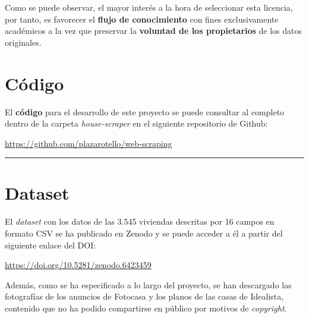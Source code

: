 \documentclass[12pt]{article}
\begin{document}
Como se puede observar, el mayor interés a la hora de seleccionar esta licencia, por tanto, es favorecer el \textbf{flujo de conocimiento} con fines exclusivamente académicos a la vez que preservar la \textbf{voluntad de los propietarios} de los datos originales. 

\newpage
\vspace{-1.5em}\section{Código}\vspace{-1em}

El \textbf{código} para el desarrollo de este proyecto se puede consultar al completo dentro de la carpeta \textit{house-scraper} en el siguiente repositorio de Github: 

\vspace{-1em}\begin{center}\url{https://github.com/plazarotello/web-scraping}\end{center}\vspace{-1em}

\begin{center}
	\vspace{-0.5cm}
	{\color{uocblue}\rule{0.75\linewidth}{1pt}}
	\vspace{-0.5cm}
\end{center}

\vspace{-1.5em}\section{Dataset}\vspace{-1em}

El \textit{dataset} con los datos de las 3.545 viviendas descritas por 16 campos en formato CSV se ha publicado en Zenodo y se puede acceder a él a partir del siguiente enlace del DOI: 

\vspace{-1em}\begin{center}\url{https://doi.org/10.5281/zenodo.6423459}\end{center}\vspace{-1em}

Además, como se ha especificado a lo largo del proyecto, se han descargado las fotografías de los anuncios de Fotocasa y los planos de las casas de Idealista, contenido que no ha podido compartirse en público por motivos de \textit{copyright}.
\end{document}
